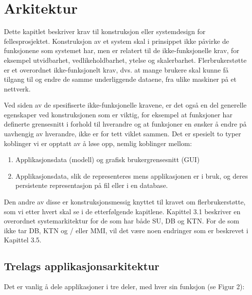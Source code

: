 
\section{Arkitektur}
Dette kapitlet beskriver krav til konstruksjon eller systemdesign for fellesprosjektet. Konstruksjon av et system skal i prinsippet ikke påvirke de funksjonene som systemet har, men er relatert til de ikke-funksjonelle krav, for eksempel utvidbarhet, vedlikeholdbarhet, ytelse og skalerbarhet. Flerbrukerstøtte er et overordnet ikke-funksjonelt krav, dvs. at mange brukere skal kunne få tilgang til og endre de samme underliggende dataene, fra ulike maskiner på et nettverk.

Ved siden av de spesifiserte ikke-funksjonelle kravene, er det også en del generelle egenskaper ved konstruksjonen som er viktig, for eksempel at funksjoner har definerte grensesnitt i forhold til hverandre og at funksjoner en ønsker å endre på uavhengig av hverandre, ikke er for tett viklet sammen. Det er spesielt to typer koblinger vi er opptatt av å løse opp, nemlig koblinger mellom:

\begin{enumerate}

\item
Applikasjonsdata (modell) og grafisk brukergrensesnitt (GUI)

\item
Applikasjonsdata, slik de representeres mens applikasjonen er i bruk, og deres persistente representasjon på fil eller i en database. 

\end{enumerate}

Den andre av disse er konstruksjonsmessig knyttet til kravet om flerbrukerstøtte, som vi etter hvert skal se i de etterfølgende kapitlene. Kapittel 3.1 beskriver en overordnet systemarkitektur for de som har både SU, DB og KTN. For de som ikke tar DB, KTN og / eller MMI, vil det være noen endringer som er beskrevet i Kapittel 3.5.

\subsection{Trelags applikasjonsarkitektur}

Det er vanlig å dele applikasjoner i tre deler, med hver sin funksjon (se Figur 2):


